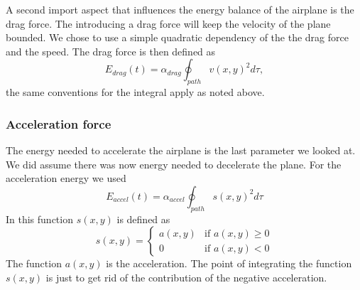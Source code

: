 A second import aspect that influences the energy balance of the airplane is the drag force.
The introducing a drag force will keep the velocity of the plane bounded.
We chose to use a simple quadratic dependency of the the drag force and the speed.
The drag force is then defined as 
\begin{equation}
E_{drag}(t)  =  \alpha_{drag} \oint_{path} v(x,y)^2  d \tau,
\end{equation}
the same conventions for the integral apply as noted above.


\subsubsection{Acceleration force}

The energy needed to accelerate the airplane is the last parameter we looked at.
We did assume there was now energy needed to decelerate the plane.
For the acceleration energy we used
\begin{equation}
E_{accel}(t)  =  \alpha_{accel} \oint_{path} s(x,y)^2  d \tau
\end{equation}
In this function $ s(x,y) $ is defined as
\begin{equation}
s(x,y) = 
\begin{cases}
   a(x,y) & \text{if } a(x,y) \geq 0 \\
   0       & \text{if } a(x,y) < 0
  \end{cases}
\end{equation}
The function $ a(x,y) $ is the acceleration.
The point of integrating the function $ s(x,y) $ is just to get rid of the contribution of the negative acceleration.





